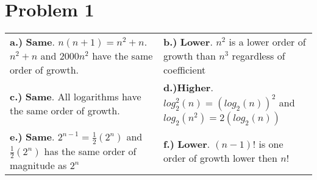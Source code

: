 \documentclass[12pt,letterpaper]{article}
\begin{document}
\section*{Problem 1}
\begin{tabular}{p{0.5\linewidth}p{0.5\linewidth}}
\textbf{a.)} \textbf{Same}. $n(n+1) = n^2+n$. $n^2+n$ and $2000n^2$ have the same order of growth. & \textbf{b.)} \textbf{Lower}. $n^2$ is a lower order of growth than $n^3$ regardless of coefficient\\
\textbf{c.)} \textbf{Same}. All logarithms have the same order of growth. & \textbf{d.)}\textbf{Higher}. $log_2^2(n) = (log_2(n))^2$ and $log_2(n^2) = 2(log_2(n))$\\
\textbf{e.)} \textbf{Same}. $2^{n-1} = \frac{1}{2}(2^n)$ and $\frac{1}{2}(2^n)$ has the same order of magnitude as $2^n$ & \textbf{f.)} \textbf{Lower}. $(n-1)!$ is one order of growth lower then $n!$\\
\end{tabular}
\end{document}
